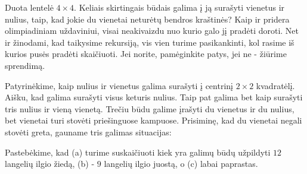 \bigskip

Duota lentelė $4 \times 4$. Keliais skirtingais būdais galima į ją surašyti vienetus ir nulius, taip, kad jokie du vienetai neturėtų bendros kraštinės? Kaip ir pridera olimpiadiniam uždaviniui, visai neakivaizdu nuo kurio galo jį pradėti doroti. Net ir žinodami, kad taikysime rekursiją, vis vien turime pasikankinti, kol rasime iš kurios pusės pradėti skaičiuoti. Jei norite, pamėginkite patys, jei ne - žiūrime sprendimą.

Patyrinėkime, kaip nulius ir vienetus galima surašyti į centrinį $2\times 2$ kvadratėlį. Aišku, kad galima surašyti visus keturis nulius. Taip pat galima bet kaip surašyti tris nulius ir vieną vienetą. Trečiu būdu galime įrašyti du vienetus ir du nulius, bet vienetai turi stovėti priešinguose kampuose. Prisiminę, kad du vienetai negali stovėti greta, gauname tris galimas situacijas:

\begin{figure}[h]
  \centering
  \hspace{2cm}               
  \hspace{2cm}
\end{figure}

Pastebėkime, kad (a) turime suskaičiuoti kiek yra galimų būdų užpildyti $12$ langelių ilgio žiedą, (b) - $9$ langelių ilgio juostą, o (c) labai paprastas.

